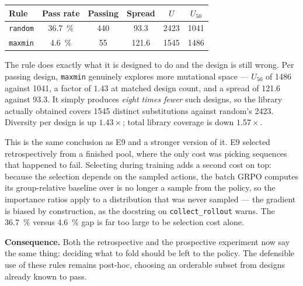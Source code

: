 
\begin{center}
\begin{tabular}{@{}lccccc@{}}
\toprule
\textbf{Rule} & \textbf{Pass rate} & \textbf{Passing} & \textbf{Spread} &
$U$ & $U_{50}$ \\
\midrule
\texttt{random}  & \SI{36.7}{\percent} & 440 & 93.3  & 2423 & 1041 \\
\texttt{maxmin}  & \SI{4.6}{\percent}  & 55  & 121.6 & 1545 & 1486 \\
\bottomrule
\end{tabular}
\end{center}

The rule does exactly what it is designed to do and the design is still wrong.
Per passing design, \texttt{maxmin} genuinely explores more mutational space ---
$U_{50}$ of 1486 against 1041, a factor of $1.43$ at matched design count, and a
spread of 121.6 against 93.3. It simply produces \emph{eight times fewer} such
designs, so the library actually obtained covers 1545 distinct substitutions
against random's 2423. Diversity per design is up $1.43\times$; total library
coverage is down $1.57\times$.

This is the same conclusion as E9 and a stronger version of it. E9 selected
retrospectively from a finished pool, where the only cost was picking sequences
that happened to fail. Selecting during training adds a second cost on top:
because the selection depends on the sampled actions, the batch GRPO computes
its group-relative baseline over is no longer a sample from the policy, so the
importance ratios apply to a distribution that was never sampled --- the
gradient is biased by construction, as the docstring on \texttt{collect\_rollout}
warns. The \SI{36.7}{\percent} versus \SI{4.6}{\percent} gap is far too large to
be selection cost alone.

\textbf{Consequence.} Both the retrospective and the prospective experiment now
say the same thing: deciding what to fold should be left to the policy. The
defensible use of these rules remains post-hoc, choosing an orderable subset from
designs already known to pass.

